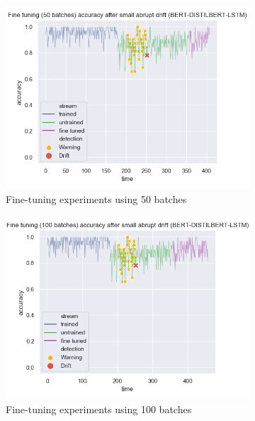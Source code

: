 \documentclass[12pt]{extreport}
\begin{document}
\begin{figure}[H]
\centering
\begin{subfigure}{.48\textwidth}
\centering
\includegraphics[width=\linewidth]{assets/addressing-change/fine_tuning_lstm_wos_1_BERT_DISTILBERT_50_batches.png}
\caption{Fine-tuning experiments using 50 batches}
\label{fig:fine50}
\end{subfigure}
\begin{subfigure}{.48\textwidth}
\centering
\includegraphics[width=\linewidth]{assets/addressing-change/fine_tuning_lstm_wos_1_BERT_DISTILBERT_100_batches.png}
\caption{Fine-tuning experiments using 100 batches}
\label{fig:fine100}
\end{subfigure}
\begin{subfigure}{.55\textwidth}

\end{subfigure}
\end{figure}
\end{document}
